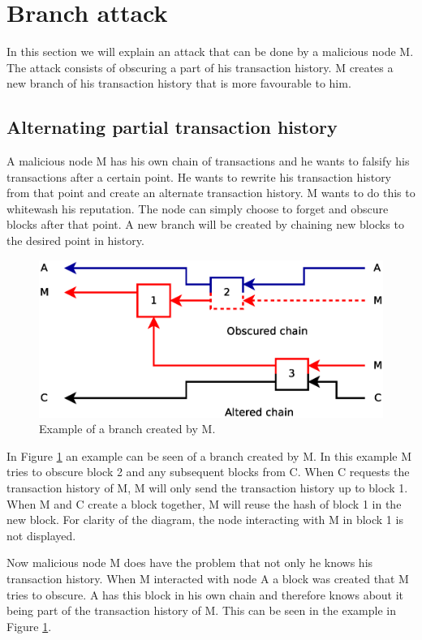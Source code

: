 \section{Branch attack}
\label{sect:branch}
In this section we will explain an attack that can be done by a malicious node M.
The attack consists of obscuring a part of his transaction history.
M creates a new branch of his transaction history that is more favourable to him.

\subsection{Alternating partial transaction history}
A malicious node M has his own chain of transactions
and he wants to falsify his transactions after a certain point.
He wants to rewrite his transaction history from that point and create an alternate transaction history.
M wants to do this to whitewash his reputation.
The node can simply choose to forget and obscure blocks after that point.
A new branch will be created by chaining new blocks to the desired point in history.

\begin{figure}
	\centerline{\includegraphics[scale=0.3]{problems/figs/branch.eps}}
	\caption{Example of a branch created by M.}
	\label{fig:problem-branch-obscure}
\end{figure}

In Figure \ref{fig:problem-branch-obscure} an example can be seen of a branch created by M.
In this example M tries to obscure block 2 and any subsequent blocks from C.
When C requests the transaction history of M, M will only send the transaction history up to block 1.
When M and C create a block together,
M will reuse the hash of block 1 in the new block.
For clarity of the diagram, the node interacting with M in block 1 is not displayed.

Now malicious node M does have the problem that not only he knows his transaction history.
When M interacted with node A a block was created that M tries to obscure.
A has this block in his own chain
and therefore knows about it being part of the transaction history of M.
This can be seen in the example in Figure \ref{fig:problem-branch-obscure}.


